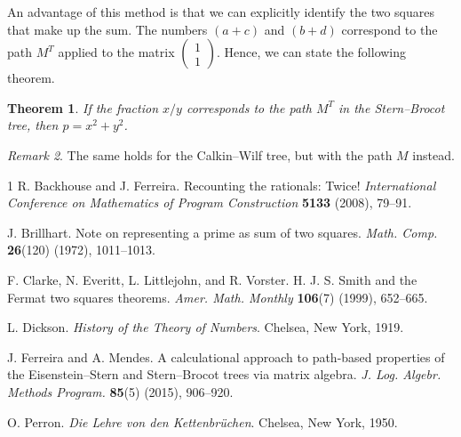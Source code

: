 \documentclass[12pt]{article}
\theoremstyle{plain}
\newtheorem{theorem}{Theorem}
\theoremstyle{definition}
\theoremstyle{remark}
\newtheorem{remark}[theorem]{Remark}
\begin{document}
An advantage of this method is that we can explicitly identify the two squares that make up the sum. The numbers $ (a + c) $ and $ (b + d) $ correspond to the path $ M^T $ applied to the matrix $ \begin{pmatrix} 1 \\ 1 \end{pmatrix} $. Hence, we can state the following theorem.
\begin{theorem}
	If the fraction $ x/y $ corresponds to the path $ M^T $ in the Stern--Brocot tree, then $ p = x^2 + y^2 $. 
\end{theorem}

\begin{remark}
	The same holds for the Calkin--Wilf tree, but with the path $ M $ instead.
\end{remark}

\begin{thebibliography}{1} \footnotesize
	 R. Backhouse and J. Ferreira. Recounting the rationals: Twice! \textit{International Conference on Mathematics of Program Construction} \textbf{5133} (2008), 79--91.
	
	 J. Brillhart. Note on representing a prime as sum of two squares. \textit{Math. Comp.} \textbf{26}(120) (1972), 1011--1013.
	
	 F. Clarke, N. Everitt, L. Littlejohn, and R. Vorster. H. J. S. Smith and the Fermat two squares theorems. \textit{Amer. Math. Monthly} \textbf{106}(7) (1999), 652--665.
	
	 L. Dickson. \textit{History of the Theory of Numbers}. Chelsea, New York, 1919.
	
	 J. Ferreira and A. Mendes. A calculational approach to path-based properties of the Eisenstein--Stern and Stern--Brocot trees via matrix algebra. \textit{J. Log. Algebr. Methods Program.} \textbf{85}(5) (2015), 906--920.
	
	 O. Perron. \textit{Die Lehre von den Kettenbr\"{u}chen}. Chelsea, New York, 1950.	
\end{thebibliography}

\vfill
\end{document}
